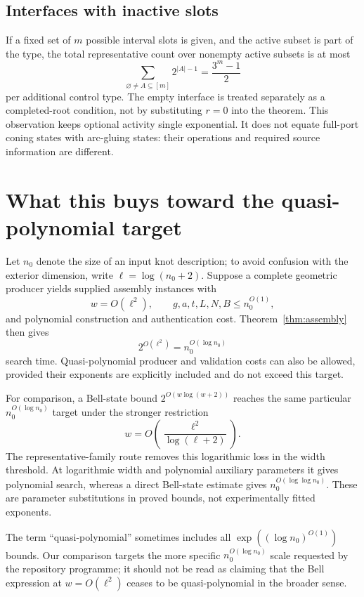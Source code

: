 \documentclass[11pt,a4paper]{article}
\theoremstyle{remark}\newtheorem{remark}[theorem]{Remark}
\begin{document}
\subsection{Interfaces with inactive slots}
If a fixed set of $m$ possible interval slots is given, and the active subset is part of the type, the total representative count over nonempty active subsets is at most
\begin{equation}\label{eq:active}
 \sum_{\varnothing\ne A\subseteq[m]}2^{|A|-1}=\frac{3^m-1}{2}
\end{equation}
per additional control type. The empty interface is treated separately as a completed-root condition, not by substituting $r=0$ into the theorem. This observation keeps optional activity single exponential. It does not equate full-port coning states with arc-gluing states: their operations and required source information are different.

\section{What this buys toward the quasi-polynomial target}\label{sec:qp}
Let $n_0$ denote the size of an input knot description; to avoid confusion with the exterior dimension, write $\ell=\log(n_0+2)$. Suppose a complete geometric producer yields supplied assembly instances with
\[
 w=O(\ell^2),\qquad g,a,t,L,N,B\le n_0^{O(1)},
\]
and polynomial construction and authentication cost. Theorem~\ref{thm:assembly} then gives
\[
 2^{O(\ell^2)}=n_0^{O(\log n_0)}
\]
search time. Quasi-polynomial producer and validation costs can also be allowed, provided their exponents are explicitly included and do not exceed this target.

For comparison, a Bell-state bound $2^{O(w\log(w+2))}$ reaches the same particular $n_0^{O(\log n_0)}$ target under the stronger restriction
\[
 w=O\!\left(\frac{\ell^2}{\log(\ell+2)}\right).
\]
The representative-family route removes this logarithmic loss in the width threshold. At logarithmic width and polynomial auxiliary parameters it gives polynomial search, whereas a direct Bell-state estimate gives $n_0^{O(\log\log n_0)}$. These are parameter substitutions in proved bounds, not experimentally fitted exponents.

The term ``quasi-polynomial'' sometimes includes all $\exp((\log n_0)^{O(1)})$ bounds. Our comparison targets the more specific $n_0^{O(\log n_0)}$ scale requested by the repository programme; it should not be read as claiming that the Bell expression at $w=O(\ell^2)$ ceases to be quasi-polynomial in the broader sense.
\end{document}
